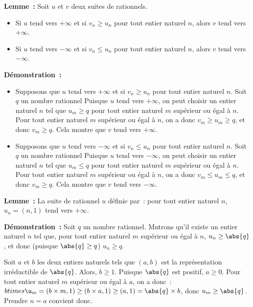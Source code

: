     \done

\medskip

\noindent\textbf{Lemme :} Soit $u$ et $v$ deux suites de rationnels.
    \begin{itemize}[nosep]
        \item Si $u$ tend vers $+\infty$ et si $v_n \geq u_n$ pour tout entier naturel $n$, alors $v$ tend vers $+\infty$.
        \item Si $u$ tend vers $-\infty$ et si $v_n \leq u_n$ pour tout entier naturel $n$, alors $v$ tend vers $-\infty$.
    \end{itemize}

\medskip

\noindent\textbf{Démonstration :} 
    \begin{itemize}[nosep]
        \item Supposons que $u$ tend vers $+\infty$ et si $v_n \geq u_n$ pour tout entier naturel $n$.
            Soit $q$ un nombre rationnel
            Puisque $u$ tend vers $+\infty$, on peut choisir un entier naturel $n$ tel que $u_m \geq q$ pour tout entier naturel $m$ supérieur ou égal à $n$.
            Pour tout entier naturel $m$ supérieur ou égal à $n$, on a donc $v_m \geq u_m \geq q$, et donc $v_m \geq q$.
            Cela montre que $v$ tend vers $+\infty$.
        \item Supposons que $u$ tend vers $-\infty$ et si $v_n \leq u_n$ pour tout entier naturel $n$.
            Soit $q$ un nombre rationnel
            Puisque $u$ tend vers $-\infty$, on peut choisir un entier naturel $n$ tel que $u_m \leq q$ pour tout entier naturel $m$ supérieur ou égal à $n$.
            Pour tout entier naturel $m$ supérieur ou égal à $n$, on a donc $v_m \leq u_m \leq q$, et donc $v_m \geq q$.
            Cela montre que $v$ tend vers $-\infty$.
    \end{itemize}

    \done

\medskip

\noindent\textbf{Lemme :} La suite de rationnel $u$ définie par : pour tout entier naturel $n$, $u_n = (n, 1)$ tend vers $+\infty$. 

\medskip

\noindent\textbf{Démonstration :} Soit $q$ un nombre rationnel.
    Mntrons qu'il existe un entier naturel $n$ tel que, pour tout entier naturel $m$ supérieur ou égal à $n$, $u_n \geq \abs{q}$, et donc (puisque $\abs{q} \geq q$) $u_n \geq q$.

    Soit $a$ et $b$ les deux entiers naturels tels que $(a, b)$ est la représentation irréductible de $\abs{q}$.
    Alors, $b \geq 1$.
    Puisque $\abs{q}$ est positif, $a \geq 0$.
    Pour tout entier naturel $m$ supérieur ou égal à $a$, on a donc : $b times \u_m = (b \times m, 1) \geq (b \times a, 1) \geq (a, 1) = \abs{q} \times b$, donc $u_m \geq \abs{q}$.
    Prendre $n = a$ convient donc.

